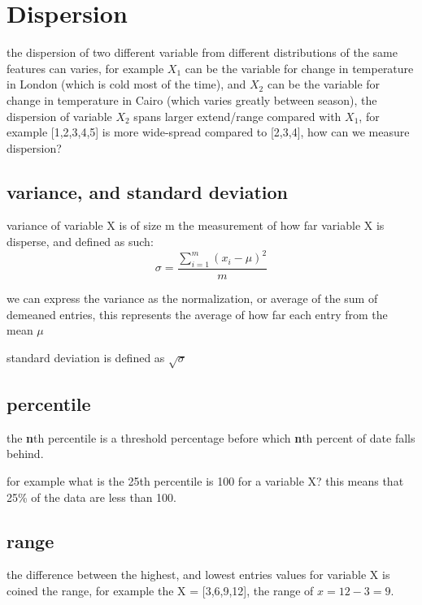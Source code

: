 \documentclass[4apaper,12pt]{book}
\begin{document}
  \section{Dispersion}
  \begin{description}
  \item the dispersion of two different variable from different distributions of the same features can varies, for example $X_1$ can be the variable for change in temperature in London (which is cold most of the time), and $X_2$ can be the variable for change in temperature in Cairo (which varies greatly between season), the dispersion of variable $X_2$ spans larger extend/range compared with $X_1$, for example [1,2,3,4,5] is more wide-spread compared to [2,3,4], how can we measure dispersion?
    \subsection{variance, and standard deviation}
  \item variance of variable X is of size m the measurement of how far variable X is disperse, and defined as such:
    \begin{equation} \sigma = \frac{\sum_{i=1}^m(x_i-\mu)^2}{m} \end{equation}
  \item we can express the variance as the normalization, or average of the sum of demeaned entries, this represents the average of how far each entry from the mean $\mu$
  \item standard deviation is defined as $\sqrt{\sigma}$
  \end{description}
  \subsection{percentile}
  \begin{description}
  \item the \textbf{n}th percentile is a threshold percentage before which \textbf{n}th percent of date falls behind.
  \item for example what is the 25th percentile is 100 for a variable X?  this means that 25\% of the data are less than 100.
  \end{description}
  \subsection{range}
  \begin{description}
  \item the difference between the highest, and lowest entries values for variable X is coined the range, for example the X = [3,6,9,12], the range of $x  = 12-3=9$.
  \end{description}
\end{document}
